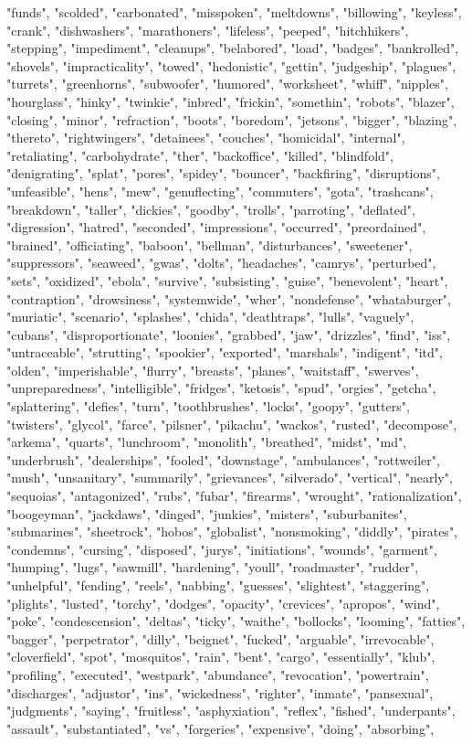 "funds", "scolded", "carbonated", "misspoken", "meltdowns", "billowing", "keyless", "crank", "dishwashers", "marathoners", "lifeless", "peeped", "hitchhikers", "stepping", "impediment", "cleanups", "belabored", "load", "badges", "bankrolled", "shovels", "impracticality", "towed", "hedonistic", "gettin", "judgeship", "plagues", "turrets", "greenhorns", "subwoofer", "humored", "worksheet", "whiff", "nipples", "hourglass", "hinky", "twinkie", "inbred", "frickin", "somethin", "robots", "blazer", "closing", "minor", "refraction", "boots", "boredom", "jetsons", "bigger", "blazing", "thereto", "rightwingers", "detainees", "couches", "homicidal", "internal", "retaliating", "carbohydrate", "ther", "backoffice", "killed", "blindfold", "denigrating", "splat", "pores", "spidey", "bouncer", "backfiring", "disruptions", "unfeasible", "hens", "mew", "genuflecting", "commuters", "gota", "trashcans", "breakdown", "taller", "dickies", "goodby", "trolls", "parroting", "deflated", "digression", "hatred", "seconded", "impressions", "occurred", "preordained", "brained", "officiating", "baboon", "bellman", "disturbances", "sweetener", "suppressors", "seaweed", "gwas", "dolts", "headaches", "camrys", "perturbed", "sets", "oxidized", "ebola", "survive", "subsisting", "guise", "benevolent", "heart", "contraption", "drowsiness", "systemwide", "wher", "nondefense", "whataburger", "muriatic", "scenario", "splashes", "chida", "deathtraps", "lulls", "vaguely", "cubans", "disproportionate", "loonies", "grabbed", "jaw", "drizzles", "find", "iss", "untraceable", "strutting", "spookier", "exported", "marshals", "indigent", "itd", "olden", "imperishable", "flurry", "breasts", "planes", "waitstaff", "swerves", "unpreparedness", "intelligible", "fridges", "ketosis", "spud", "orgies", "getcha", "splattering", "defies", "turn", "toothbrushes", "locks", "goopy", "gutters", "twisters", "glycol", "farce", "pilsner", "pikachu", "wackos", "rusted", "decompose", "arkema", "quarts", "lunchroom", "monolith", "breathed", "midst", "md", "underbrush", "dealerships", "fooled", "downstage", "ambulances", "rottweiler", "mush", "unsanitary", "summarily", "grievances", "silverado", "vertical", "nearly", "sequoias", "antagonized", "rubs", "fubar", "firearms", "wrought", "rationalization", "boogeyman", "jackdaws", "dinged", "junkies", "misters", "suburbanites", "submarines", "sheetrock", "hobos", "globalist", "nonsmoking", "diddly", "pirates", "condemns", "cursing", "disposed", "jurys", "initiations", "wounds", "garment", "humping", "lugs", "sawmill", "hardening", "youll", "roadmaster", "rudder", "unhelpful", "fending", "reels", "nabbing", "guesses", "slightest", "staggering", "plights", "lusted", "torchy", "dodges", "opacity", "crevices", "apropos", "wind", "poke", "condescension", "deltas", "ticky", "waithe", "bollocks", "looming", "fatties", "bagger", "perpetrator", "dilly", "beignet", "fucked", "arguable", "irrevocable", "cloverfield", "spot", "mosquitos", "rain", "bent", "cargo", "essentially", "klub", "profiling", "executed", "westpark", "abundance", "revocation", "powertrain", "discharges", "adjustor", "ins", "wickedness", "righter", "inmate", "pansexual", "judgments", "saying", "fruitless", "asphyxiation", "reflex", "fished", "underpants", "assault", "substantiated", "vs", "forgeries", "expensive", "doing", "absorbing", 